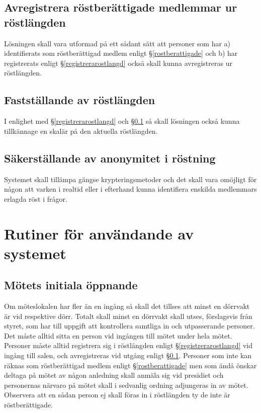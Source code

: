 \documentclass{datateknologsektionen-document}
\begin{document}
\subsection{Avregistrera röstberättigade medlemmar ur röstlängden}
\label{avregistrerarostlangd}
Lösningen skall vara utformad på ett sådant sätt att personer som har a) identifierats som
röstberättigad medlem enligt \S \ref{rostberattigade} och b) har registrerats enligt \S \ref{registrerarostlangd} också skall kunna avregistreras
ur röstlängden.
\subsection{Fastställande av röstlängden}
\label{faststallarostlangd}
I enlighet med \S \ref{registrerarostlangd} och \S \ref{avregistrerarostlangd} så skall lösningen också kunna tillkännage en skalär på den aktuella
röstlängden.
\subsection{Säkerställande av anonymitet i röstning}
Systemet skall tillämpa gängse krypteringsmetoder och det skall vara omöjligt för någon att varken i
realtid eller i efterhand kunna identifiera enskilda medlemmars erlagda röst i frågor.
\section{Rutiner för användande av systemet}
\label{anvandande}
\subsection{Mötets initiala öppnande}
\label{motetsoppnande}
Om möteslokalen har fler än en ingång så skall det tillses att minst en dörrvakt är vid respektive dörr.
Totalt skall minst en dörrvakt skall utses, förslagsvis från styret, som har till uppgift att kontrollera
samtliga in och utpasserande personer. Det måste alltid sitta en person vid ingången till mötet under
hela mötet. Personer måste alltid registrera sig i röstlängden enligt \S \ref{registrerarostlangd} vid ingång till salen, och
avregistreras vid utgång enligt \S \ref{avregistrerarostlangd}. Personer som inte kan räknas som röstberättigad medlem enligt
\S \ref{rostberattigade} men som ändå önskar deltaga på mötet av någon anledning skall anmäla sig vid presidiet och
personernas närvaro på mötet skall i sedvanlig ordning adjungeras in av mötet. Observera att en
sådan person ej skall föras in i röstlängden ty de inte är röstberättigade.
\end{document}
